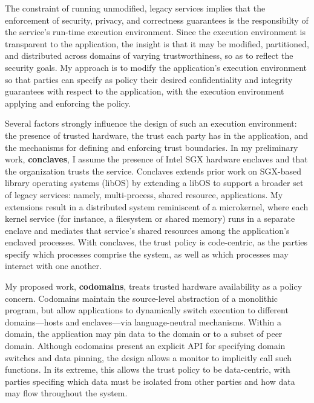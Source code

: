 

%
The constraint of running unmodified, legacy services implies that the
enforcement of security, privacy, and correctness guarantees is the
responsibilty of the service's run-time execution environment. 
%
Since the execution environment is transparent to the application, the insight
is that it may be modified, partitioned, and distributed across domains of
varying trustworthiness, so as to reflect the security goals.
%
My approach is to modify the application's execution environment so that
parties can specify as policy their desired confidentiality and integrity
guarantees with respect to the application, with the execution environment
applying and enforcing the policy.


Several factors strongly influence the design of such an execution environment:
the presence of trusted hardware, the trust each party has in the application,
and the mechanisms for defining and enforcing trust boundaries.
%
In my preliminary work, \textbf{conclaves}, I assume the presence of Intel SGX hardware
enclaves and that the organization trusts the service.
%
Conclaves extends prior work on SGX-based library operating systems (libOS) by
extending a libOS to support a broader set of legacy services: namely,
multi-process, shared resource, applications.
%
My extensions result in a distributed system reminiscent of a microkernel,
where each kernel service (for instance, a filesystem or shared memory)
runs in a separate enclave and mediates that service’s shared resources
among the application's enclaved processes.
%
With conclaves, the trust policy is code-centric, as the parties specify which
processes comprise the system, as well as which processes may interact with one
another.


My proposed work, \textbf{codomains}, treats trusted hardware availability as a
policy concern.
%
Codomains maintain the source-level abstraction of a monolithic program, but
allow applications to dynamically switch execution to different domains---hosts
and enclaves---via language-neutral mechanisms.
%
Within a domain, the application may pin data to the domain or to a subset of
peer domain.
%
Although codomains present an explicit API for specifying domain switches and
data pinning, the design allows a monitor to implicitly call such functions.
%
In its extreme, this allows the trust policy to be data-centric, with parties
specifing which data must be isolated from other parties and how data may flow
throughout the system.


